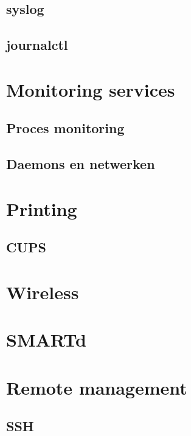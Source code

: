 \documentclass[a4paper,12pt,twoside,openright,titlepage]{book}
\begin{document}
\section{syslog}\label{sec:syslog}


\section{journalctl}\label{sec:journalctl}


\chapter{Monitoring services}

\section{Proces monitoring}

\section{Daemons en netwerken}


\chapter{Printing}

\section{CUPS}



\chapter{Wireless}

\chapter{SMARTd}

\chapter{Remote management}
\section{SSH}
\end{document}
